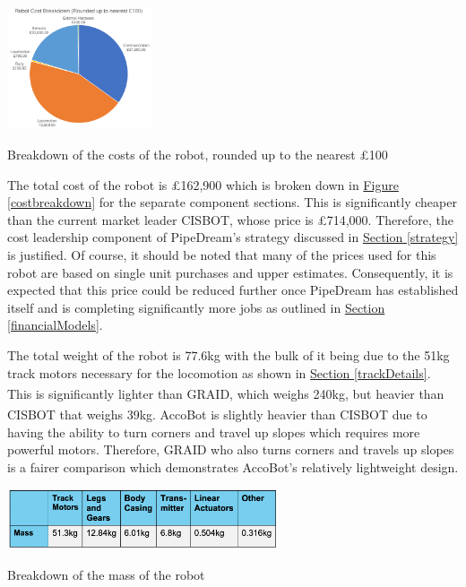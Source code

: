 \documentclass[11pt]{article}		%
\newcommand{\supercite}[1]{\textsuperscript{\cite{#1}}}		%
\newcommand{\figref}[1]{\hyperref[#1]{Figure \ref*{#1}}}    %
\newcommand{\sectref}[1]{\hyperref[#1]{Section \ref*{#1}}}     %
\begin{document}
		    \begin{floatingfigure}[r]{0.35\textwidth}
				\centering
				\includegraphics[width=0.32\textwidth]{costBreakdown}
				\caption{Breakdown of the costs of the robot, rounded up to the nearest £100}
				\label{costbreakdown}
			\end{floatingfigure}
		    The total cost of the robot is £162,900 which is broken down in \figref{costbreakdown} for the separate component sections. This is significantly cheaper than the current market leader CISBOT, whose price is £714,000. Therefore, the cost leadership component of PipeDream's strategy discussed in \sectref{strategy} is justified. 
	     	Of course, it should be noted that many of the prices used for this robot are based on single unit purchases and upper estimates. Consequently, it is expected that this price could be reduced further once PipeDream has established itself and is completing significantly more jobs as outlined in \sectref{financialModels}. 
            \begin{floatingfigure}[r]{0pt} \end{floatingfigure} 
	        \hspace*{2ex}The total weight of the robot is 77.6kg with the bulk of it being due to the 51kg track motors necessary for the locomotion as shown in \sectref{trackDetails}. This is significantly lighter than GRAID, which weighs 240kg\supercite{graidweight}, but heavier than CISBOT that weighs 39kg\supercite{cisbotweight}. AccoBot is slightly heavier than CISBOT due to having the ability to turn corners and travel up slopes which requires more powerful motors. Therefore, GRAID who also turns corners and travels up slopes is a fairer comparison which demonstrates AccoBot's relatively lightweight design. 
            \begin{table}[h]
				\centering
				\includegraphics[width=0.6\textwidth]{weightsbreaks.png}
				\caption{Breakdown of the mass of the robot}
				\label{massbreakdown}
			\end{table}
			\vspace{-\baselineskip}
    
\end{document}
